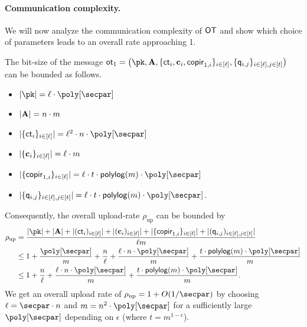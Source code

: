 \paragraph{Communication complexity.}
We will now analyze the communication complexity of $\mathsf{OT}$ and show which choice of parameters leads to an overall rate approaching 1.

The bit-size of the message $\ot_1=\left(\pk,\vc{A},\{\ct_i, \vc{c}_i,\copir_{1,i}\}_{i\in [\ell]},\{\quer_{i,j}\}_{i \in [\ell], j \in [t]}\right)$ can be bounded as follows. 
\begin{itemize}
\item $|\pk| = \ell \cdot \poly[\secpar]$
\item $|\mathbf{A}| = n \cdot m$
\item $|\{\ct_i\}_{i \in [\ell]}| = \ell^2 \cdot n \cdot \poly[\secpar]$
\item $|\{\mathbf{c}_i\}_{i\in [\ell]}| = \ell \cdot m$
\item $|\{\copir_{1,i}\}_{i\in [\ell]}|=\ell \cdot t \cdot \mathsf{polylog}(m)\cdot \poly[\secpar]$
\item $|\{\quer_{i,j}\}_{i \in [\ell], j \in [t]}| = \ell \cdot t \cdot\mathsf{polylog}(m)\cdot \poly[\secpar]$.
\end{itemize}
Consequently, the overall upload-rate $\rho_{\text{up}}$ can be bounded by
\begin{align*}
\rho_{\text{up}} &= \frac{|\pk| + |\vc{A}| + |(\ct_i)_{i \in [\ell]}| + |(\vc{c}_i)_{i\in [\ell]}|+|\{\copir_{1,i}\}_{i\in [\ell]}| + |(\quer_{i,j})_{i \in [\ell], j \in [t]}|}{\ell m}\\
&\leq 1 + \frac{\poly[\secpar]}{m} + \frac{n}{\ell} + \frac{\ell \cdot n \cdot \poly[\secpar]}{m} + \frac{ t\cdot\mathsf{polylog}(m) \cdot \poly[\secpar]}{m}\\
&\leq 1 + \frac{n}{\ell} + \frac{\ell \cdot n\cdot \poly[\secpar]}{m} + \frac{t\cdot\mathsf{polylog}(m) \cdot \poly[\secpar]}{m}.
\end{align*}
We get an overall upload rate of $\rho_{\text{up}} = 1 + O(1 / \secpar)$ by choosing $\ell = \secpar \cdot n$ and $m = n^2 \cdot \poly[\secpar]$ for a sufficiently large $\poly[\secpar]$ depending on $\epsilon$ (where $t = m^{1 - \epsilon}$).

